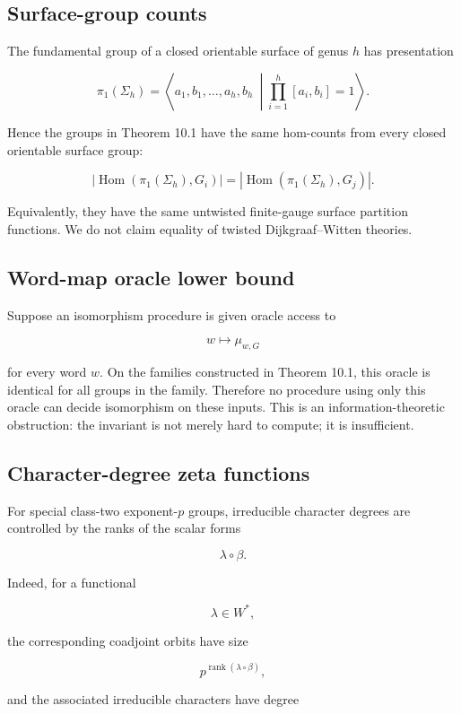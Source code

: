 \documentclass[11pt]{article}
\begin{document}
\subsection{Surface-group counts}

The fundamental group of a closed orientable surface of genus $h$ has presentation

\[
\pi_1(\Sigma_h)=
\left\langle
a_1,b_1,\ldots,a_h,b_h
\ \middle|
\prod_{i=1}^h[a_i,b_i]=1
\right\rangle.
\]

Hence the groups in Theorem 10.1 have the same hom-counts from every closed orientable surface group:

\[
|\operatorname{Hom}(\pi_1(\Sigma_h),G_i)|
=|\operatorname{Hom}(\pi_1(\Sigma_h),G_j)|.
\]

Equivalently, they have the same untwisted finite-gauge surface partition functions. We do not claim equality of twisted Dijkgraaf--Witten theories.

\subsection{Word-map oracle lower bound}

Suppose an isomorphism procedure is given oracle access to

\[
w\longmapsto \mu_{w,G}
\]

for every word $w$. On the families constructed in Theorem 10.1, this oracle is identical for all groups in the family. Therefore no procedure using only this oracle can decide isomorphism on these inputs. This is an information-theoretic obstruction: the invariant is not merely hard to compute; it is insufficient.

\subsection{Character-degree zeta functions}

For special class-two exponent-$p$ groups, irreducible character degrees are controlled by the ranks of the scalar forms

\[
\lambda\circ\beta.
\]

Indeed, for a functional

\[
\lambda\in W^*,
\]

the corresponding coadjoint orbits have size

\[
p^{\operatorname{rank}(\lambda\circ\beta)},
\]

and the associated irreducible characters have degree
\end{document}
